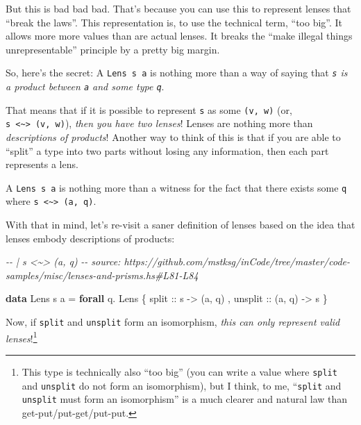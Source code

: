 \documentclass[]{article}
\newenvironment{Shaded}{}{}
\newcommand{\CommentTok}[1]{\textcolor[rgb]{0.38,0.63,0.69}{\textit{#1}}}
\newcommand{\DataTypeTok}[1]{\textcolor[rgb]{0.56,0.13,0.00}{#1}}
\newcommand{\KeywordTok}[1]{\textcolor[rgb]{0.00,0.44,0.13}{\textbf{#1}}}
\newcommand{\NormalTok}[1]{#1}
\newcommand{\OperatorTok}[1]{\textcolor[rgb]{0.40,0.40,0.40}{#1}}
\newcommand{\OtherTok}[1]{\textcolor[rgb]{0.00,0.44,0.13}{#1}}
\begin{document}
But this is bad bad bad. That's because you can use this to represent lenses
that ``break the laws''. This representation is, to use the technical term,
``too big''. It allows more more values than are actual lenses. It breaks the
``make illegal things unrepresentable'' principle by a pretty big margin.

So, here's the secret: A \texttt{Lens\textquotesingle{}\ s\ a} is nothing more
than a way of saying that \emph{\texttt{s} is a product between \texttt{a} and
some type \texttt{q}}.

That means that if it is possible to represent \texttt{s} as some
\texttt{(v,\ w)} (or,
\texttt{s\ \textless{}\textasciitilde{}\textgreater{}\ (v,\ w)}), \emph{then you
have two lenses}! Lenses are nothing more than \emph{descriptions of products}!
Another way to think of this is that if you are able to ``split'' a type into
two parts without losing any information, then each part represents a lens.

A \texttt{Lens\textquotesingle{}\ s\ a} is nothing more than a witness for the
fact that there exists some \texttt{q} where
\texttt{s\ \textless{}\textasciitilde{}\textgreater{}\ (a,\ q)}.

With that in mind, let's re-visit a saner definition of lenses based on the idea
that lenses embody descriptions of products:

\begin{Shaded}
\begin{Highlighting}[]
\CommentTok{{-}{-} | s \textless{}\textasciitilde{}\textgreater{} (a, q)}
\CommentTok{{-}{-} source: https://github.com/mstksg/inCode/tree/master/code{-}samples/misc/lenses{-}and{-}prisms.hs\#L81{-}L84}

\KeywordTok{data} \DataTypeTok{Lens\textquotesingle{}}\NormalTok{ s a }\OtherTok{=} \KeywordTok{forall}\NormalTok{ q}\OperatorTok{.} \DataTypeTok{Lens\textquotesingle{}}
\NormalTok{    \{}\OtherTok{ split   ::}\NormalTok{ s }\OtherTok{{-}\textgreater{}}\NormalTok{ (a, q)}
\NormalTok{    ,}\OtherTok{ unsplit ::}\NormalTok{ (a, q) }\OtherTok{{-}\textgreater{}}\NormalTok{ s}
\NormalTok{    \}}
\end{Highlighting}
\end{Shaded}

Now, if \texttt{split} and \texttt{unsplit} form an isomorphism, \emph{this can
only represent valid lenses}!\footnote{This type is technically also ``too big''
  (you can write a value where \texttt{split} and \texttt{unsplit} do not form
  an isomorphism), but I think, to me, ``\texttt{split} and \texttt{unsplit}
  must form an isomorphism'' is a much clearer and natural law than
  get-put/put-get/put-put.}
\end{document}
